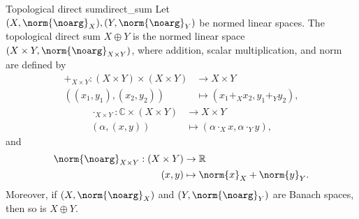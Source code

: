 \begin{proposition}{Topological direct sum}{direct_sum}
    Let \((X, \norm{\noarg}_X), (Y, \norm{\noarg}_Y)\) be normed linear spaces. The topological direct sum \(X \oplus Y\) is the normed linear space \((X \times Y, \norm{\noarg}_{X \times Y})\), where addition, scalar multiplication, and norm are defined by
    \begin{align*}
        +_{X \times Y} : (X \times Y) \times (X \times Y) &\to X \times Y\\
        \left((x_1,y_1),(x_2,y_2)\right)&\mapsto (x_1 +_X x_2, y_1 +_Y y_2),
    \end{align*}
    \begin{align*}
        \cdot_{X \times Y} : \mathbb{C} \times (X \times Y) &\to X \times Y\\
        \left(\alpha,(x,y)\right)&\mapsto (\alpha \cdot_X x, \alpha \cdot_Y y),
    \end{align*}
    and
    \begin{align*}
        \norm{\noarg}_{X \times Y} : (X \times Y) &\to \mathbb{R}\\
        (x,y)&\mapsto \norm{x}_X + \norm{y}_Y.
    \end{align*}
    Moreover, if \((X, \norm{\noarg}_X)\) and \((Y, \norm{\noarg}_Y)\) are Banach spaces, then so is \(X \oplus Y\).
\end{proposition}

